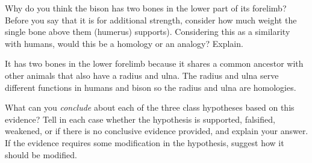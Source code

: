 \documentclass[12pt, addpoints, hidelinks]{exam}
\newcommand*\AnswerBox[2]{%
    \parbox[t][#1]{0.92\textwidth}{%
    \begin{solution}#2\end{solution}}
}
\begin{document}
\begin{questions}
\question[2]
Why do you think the bison has two bones in the lower part of
its forelimb? Before you say that it is for additional strength,
consider how much weight the single bone above them (humerus) supports).
Considering this as a similarity with humans, would this be a homology
or an analogy? Explain.

\AnswerBox{6\baselineskip}{It has two bones in the lower forelimb because it shares a common ancestor with other animals that also have a radius and ulna. The radius and ulna serve different functions in humans and bison so the radius and ulna are homologies.}

\question[3]
What can you \emph{conclude} about each of the three class
hypotheses based on this evidence? Tell in each case whether the
hypothesis is supported, falsified, weakened, or if there is no
conclusive evidence provided, and explain your answer. If the evidence
requires some modification in the hypothesis, suggest how it should be
modified.


\end{questions}
\end{document}
